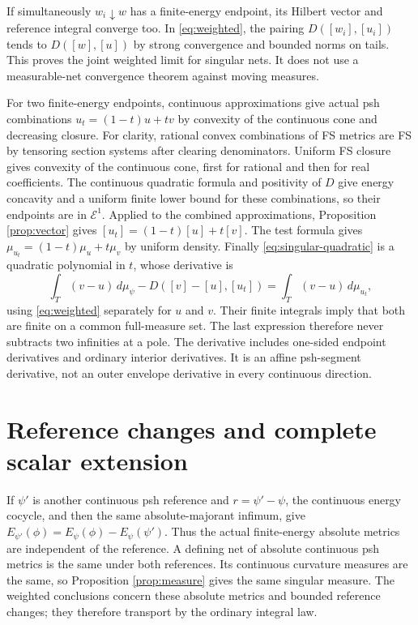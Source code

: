 \documentclass[11pt]{article}
\newcommand{\E}{\mathcal E}
\begin{document}
If simultaneously $w_i\downarrow w$ has a finite-energy endpoint,
its Hilbert vector and reference integral converge too. In
\eqref{eq:weighted}, the pairing
$D([w_i],[u_i])$ tends to $D([w],[u])$ by strong convergence
and bounded norms on tails. This proves the joint weighted limit
for singular nets. It does not use a measurable-net convergence
theorem against moving measures.

For two finite-energy endpoints, continuous approximations give
actual psh combinations $u_t=(1-t)u+tv$ by convexity of the
continuous cone and decreasing closure. For clarity, rational convex
combinations of FS metrics are FS by tensoring section systems after
clearing denominators. Uniform FS closure gives convexity of the
continuous cone, first for rational and then for real coefficients.
The continuous quadratic formula and positivity of $D$ give energy
concavity and a uniform finite lower bound for these combinations,
so their endpoints are in $\E^1$. Applied to the combined
approximations, Proposition \ref{prop:vector} gives
$[u_t]=(1-t)[u]+t[v]$. The test formula gives
$\mu_{u_t}=(1-t)\mu_u+t\mu_v$ by uniform density.
Finally \eqref{eq:singular-quadratic} is a quadratic polynomial
in $t$, whose derivative is
\[
 \int_T(v-u)\,d\mu_\psi-D([v]-[u],[u_t])
 =\int_T(v-u)\,d\mu_{u_t},
\]
using \eqref{eq:weighted} separately for $u$ and $v$.
Their finite integrals imply that both are finite on a common
full-measure set. The last expression therefore never subtracts
two infinities at a pole. The derivative includes one-sided
endpoint derivatives and ordinary interior derivatives. It is
an affine psh-segment derivative, not an outer envelope derivative
in every continuous direction.

\section{Reference changes and complete scalar extension}

If $\psi'$ is another continuous psh reference and
$r=\psi'-\psi$, the continuous energy cocycle, and then the
same absolute-majorant infimum, give
$E_{\psi'}(\phi)=E_\psi(\phi)-E_\psi(\psi')$.
Thus the actual finite-energy absolute metrics are independent of
the reference. A defining net of absolute continuous psh metrics
is the same under both references. Its continuous curvature measures
are the same, so Proposition \ref{prop:measure} gives the same
singular measure. The weighted conclusions concern these absolute
metrics and bounded reference changes; they therefore transport
by the ordinary integral law.
\end{document}
